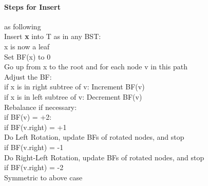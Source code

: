 \documentclass[11pt]{article}
\newcommand{\tb}[1]{\textbf{#1}}
\begin{document}
	\paragraph{Steps for Insert} as following\\
	Insert \tb{x} into T as in any BST: \\
	\indent x is now a leaf\\
	\indent Set BF(x) to 0 \\
	Go up from x to the root and for each node v in this path \\
	\indent Adjust the BF: \\
	\indent\indent if x is in right subtree of v: Increment BF(v) \\
	\indent\indent if x is in left subtree of v: Decrement BF(v) \\
	\indent Rebalance if necessary: \\
	\indent if BF(v) = +2:\\
	\indent\indent if BF(v.right) = +1\\
	\indent\indent\indent Do Left Rotation, update BFs of rotated nodes, and stop\\
	\indent\indent if BF(v.right) = -1\\
	\indent\indent\indent Do Right-Left Rotation, update BFs of rotated nodes, and stop\\
	\indent\indent if BF(v.right) = -2\\
	\indent\indent\indent Symmetric to above case

	
	
	
\end{document}
